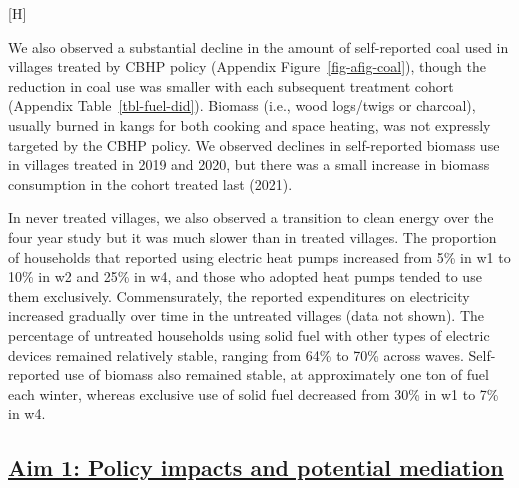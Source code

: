 \documentclass[
  letterpaper,
  DIV=11,
  numbers=noendperiod]{scrartcl}
\makeatletter
\renewenvironment{figure}%
   {\renewcommand\familydefault\sfdefault
    \@float{figure}}
   {\end@float}
\providecommand{\DIFadd}[1]{{\protect\color{blue}\underline{#1}}} %
\providecommand{\DIFaddbegin}{} %
\providecommand{\DIFaddend}{} %
\providecommand{\DIFdelbegin}{} %
\providecommand{\DIFdelend}{} %
\providecommand{\DIFaddbeginFL}{} %
\providecommand{\DIFaddendFL}{} %
\providecommand{\DIFdelbeginFL}{} %
\providecommand{\DIFdelendFL}{} %
\newcommand{\DIFscaledelfig}{0.5}
\newlength{\DIFdelgraphicswidth} %
\newlength{\DIFdelgraphicsheight} %
\newcommand{\DIFaddincludegraphics}[2][]{{\color{blue}\fbox{\DIFOincludegraphics[#1]{#2}}}} %
\newcommand{\DIFdelincludegraphics}[2][]{%
\sbox{\DIFdelgraphicsbox}{\DIFOincludegraphics[#1]{#2}}%
\settoboxwidth{\DIFdelgraphicswidth}{\DIFdelgraphicsbox} %
\settoboxtotalheight{\DIFdelgraphicsheight}{\DIFdelgraphicsbox} %
\scalebox{\DIFscaledelfig}{%
\parbox[b]{\DIFdelgraphicswidth}{\usebox{\DIFdelgraphicsbox}\\[-\baselineskip] \rule{\DIFdelgraphicswidth}{0em}}\llap{\resizebox{\DIFdelgraphicswidth}{\DIFdelgraphicsheight}{%
\setlength{\unitlength}{\DIFdelgraphicswidth}%
\begin{picture}(1,1)%
\thicklines\linethickness{2pt} %
{\color[rgb]{1,0,0}\put(0,0){\framebox(1,1){}}}%
{\color[rgb]{1,0,0}\put(0,0){\line( 1,1){1}}}%
{\color[rgb]{1,0,0}\put(0,1){\line(1,-1){1}}}%
\end{picture}%
}\hspace*{3pt}}} %
} %
\DeclareRobustCommand{\DIFaddbegin}{\DIFOaddbegin \let\includegraphics\DIFaddincludegraphics} %
\DeclareRobustCommand{\DIFaddend}{\DIFOaddend \let\includegraphics\DIFOincludegraphics} %
\DeclareRobustCommand{\DIFdelbegin}{\DIFOdelbegin \let\includegraphics\DIFdelincludegraphics} %
\DeclareRobustCommand{\DIFdelend}{\DIFOaddend \let\includegraphics\DIFOincludegraphics} %
\DeclareRobustCommand{\DIFaddbeginFL}{\DIFOaddbeginFL \let\includegraphics\DIFaddincludegraphics} %
\DeclareRobustCommand{\DIFaddendFL}{\DIFOaddendFL \let\includegraphics\DIFOincludegraphics} %
\DeclareRobustCommand{\DIFdelbeginFL}{\DIFOdelbeginFL \let\includegraphics\DIFdelincludegraphics} %
\DeclareRobustCommand{\DIFdelendFL}{\DIFOaddendFL \let\includegraphics\DIFOincludegraphics} %
\makeatother
\begin{document}
\begin{figure}[H]

\DIFdelbeginFL %
\DIFdelendFL \DIFaddbeginFL {}
\DIFaddendFL 

\DIFdelbeginFL %

\DIFdelendFL \caption{\label{fig-sankey}Transitions to different energy sources
across study waves}

\end{figure}%

We also observed a substantial decline in the amount of self-reported
coal used in villages treated by CBHP policy (Appendix
Figure~\ref{fig-afig-coal}), though the reduction in coal use was
smaller with each subsequent treatment cohort (Appendix
Table~\ref{tbl-fuel-did}). Biomass (i.e., wood logs/twigs or charcoal),
usually burned in kangs for both cooking and space heating, was not
expressly targeted by the CBHP policy. We observed declines in
self-reported biomass use in villages treated in 2019 and 2020, but
there was a small increase in biomass consumption in the cohort treated
last (2021).

In never treated villages, we also observed a transition to clean energy
over the four year study but it was much slower than in treated
villages. The proportion of households that reported using electric heat
pumps increased from 5\% in w1 to 10\% in w2 and 25\% in w4, and those
who adopted heat pumps tended to use them exclusively. Commensurately,
the reported expenditures on electricity increased gradually over time
in the untreated villages (data not shown). The percentage of untreated
households using solid fuel with other types of electric devices
remained relatively stable, ranging from 64\% to 70\% across waves.
Self-reported use of biomass also remained stable, at approximately one
ton of fuel each winter, whereas exclusive use of solid fuel decreased
from 30\% in w1 to 7\% in w4.

\DIFdelbegin %
\DIFdelend \DIFaddbegin \subsection{\DIFadd{Aim 1: Policy impacts and potential
mediation}}\label{aim-1-policy-impacts-and-potential-mediation}
\DIFaddend 
\end{document}
